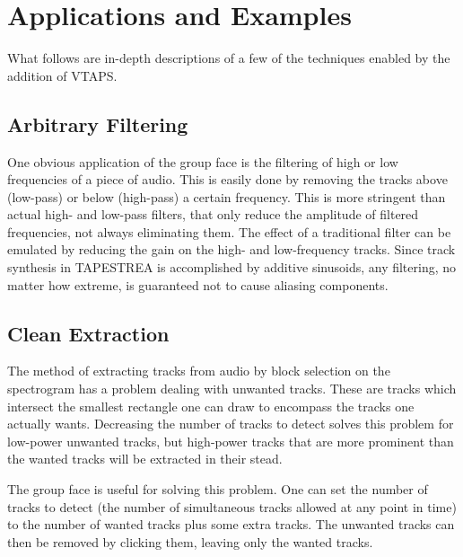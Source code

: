 \documentclass{article}
\begin{document}

\section{Applications and Examples}

What follows are in-depth descriptions of a few of the techniques enabled by
the addition of VTAPS.

\subsection{Arbitrary Filtering}

One obvious application of the group face is the filtering of high or low
frequencies of a piece of audio. This is easily done by removing the tracks
above (low-pass) or below (high-pass) a certain frequency.  This is more
stringent than actual high- and low-pass filters, that only reduce the
amplitude of filtered frequencies, not always eliminating them. The effect 
of a traditional filter can be emulated by reducing the 
gain on the high- and low-frequency tracks. Since track synthesis in TAPESTREA 
is accomplished by additive sinusoids, any filtering, no matter how extreme, is 
guaranteed not to cause aliasing components.

\subsection{Clean Extraction}


The method of extracting tracks from audio by block selection on the
spectrogram has a problem dealing with unwanted tracks. These are
tracks which intersect the smallest rectangle one can draw to encompass the
tracks one actually wants. Decreasing the number of tracks to detect solves
this problem for low-power unwanted tracks, but high-power tracks that are more
prominent than the wanted tracks will be extracted in their stead.

The group face is useful for solving this problem. 
One can set the number of tracks to detect (the number of simultaneous tracks
allowed at any point in time) to the number of wanted tracks plus some extra tracks. 
The unwanted tracks can then be removed by clicking them, leaving
only the wanted tracks.
\end{document}
